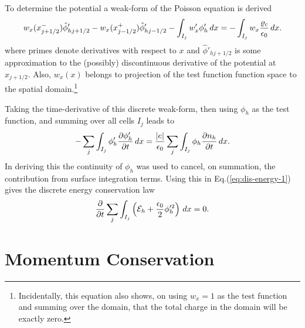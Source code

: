 \documentclass[11pt, reqno]{amsart}
\newcommand{\eqr}[1]{Eq.\thinspace(#1)}
\newcommand{\pfrac}[2]{\frac{\partial #1}{\partial #2}}
\theoremstyle{definition}
\begin{document}
To determine the potential a weak-form of the Poisson equation is
derived
\begin{align}
  w_x(x^-_{j+1/2})\hat{\phi}'_{hj+1/2} -  w_x(x^+_{j-1/2})\hat{\phi}'_{hj-1/2}
  -
  \int_{I_j} w_x'\phi_h'\thinspace dx
  =
  -\int_{I_j} w_x \frac{\varrho_{c}}{\epsilon_0}\thinspace dx.
  \label{eq:weak-poisson}
\end{align}
where primes denote derivatives with respect to $x$ and
$\hat{\phi}'_{hj+1/2}$ is some approximation to the (possibly)
discontinuous derivative of the potential at $x_{j+1/2}$. Also,
$w_x(x)$ belongs to projection of the test function function space to
the spatial domain.\footnote{Incidentally, this equation also shows,
  on using $w_x=1$ as the test function and summing over the domain,
  that the total charge in the domain will be exactly zero.}

Taking the time-derivative of this discrete weak-form, then using
$\phi_h$ as the test function, and summing over all cells $I_j$ leads
to
\begin{align}
  -\sum_j \int_{I_j} \phi_h'\pfrac{\phi_h'}{t}\thinspace dx
  =
  \frac{|e|}{\epsilon_0}
  \sum_j
  \int_{I_j}
  \phi_h
  \pfrac{n_h}{t}
  \thinspace dx.
\end{align}
In deriving this the continuity of $\phi_h$ was used to cancel, on
summation, the contribution from surface integration terms. Using this
in \eqr{\ref{eq:dis-energy-1}} gives the discrete energy conservation
law
\begin{align}
  \frac{\partial }{\partial t}
  \sum_{j}\int_{I_{j}} 
  \left(
  \mathcal{E}_h
  + \frac{\epsilon_0}{2}\phi_h'^2
  \right)
  \thinspace dx
  =
  0.
  \label{eq:dis-energy}
\end{align}

\section{Momentum Conservation}
\end{document}
